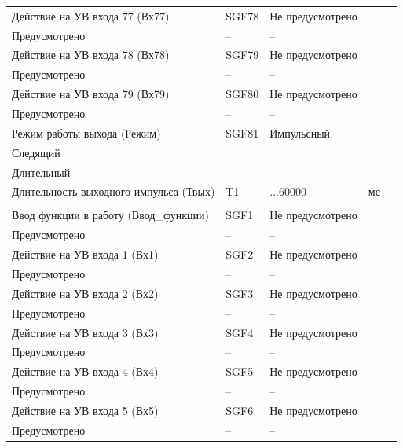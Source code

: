 \begin{longtable}{|>{\centering\arraybackslash}m{5.3cm}|>{\centering\arraybackslash}m{3.3cm}|>{\centering\arraybackslash}m{4.2cm}|>{\centering\arraybackslash}m{1.8cm}|>{\centering\arraybackslash}m{1cm}|}
\hline
\centering Действие на УВ входа 77 (Вх77)  & \centering SGF78 & \centering Не предусмотрено \\ Предусмотрено & \centering -- & \centering \arraybackslash -- \\
\hline
\centering Действие на УВ входа 78 (Вх78)  & \centering SGF79 & \centering Не предусмотрено \\ Предусмотрено & \centering -- & \centering \arraybackslash -- \\
\hline
\centering Действие на УВ входа 79 (Вх79)  & \centering SGF80 & \centering Не предусмотрено \\ Предусмотрено & \centering -- & \centering \arraybackslash -- \\
\hline
\centering Режим работы выхода (Режим)  & \centering SGF81 & \centering Импульсный \\ Следящий \\ Длительный & \centering -- & \centering \arraybackslash -- \\
\hline
\centering Длительность выходного импульса (Твых)  & \centering T1 & \centering 50...60000 & \centering мс & \centering \arraybackslash 10 \\
\hline
\multicolumn{5}{|c|}{ УВ12 } \\ \hline 
\centering Ввод функции в работу (Ввод\_функции)  & \centering SGF1 & \centering Не предусмотрено \\ Предусмотрено & \centering -- & \centering \arraybackslash -- \\
\hline
\centering Действие на УВ входа 1 (Вх1)  & \centering SGF2 & \centering Не предусмотрено \\ Предусмотрено & \centering -- & \centering \arraybackslash -- \\
\hline
\centering Действие на УВ входа 2 (Вх2)  & \centering SGF3 & \centering Не предусмотрено \\ Предусмотрено & \centering -- & \centering \arraybackslash -- \\
\hline
\centering Действие на УВ входа 3 (Вх3)  & \centering SGF4 & \centering Не предусмотрено \\ Предусмотрено & \centering -- & \centering \arraybackslash -- \\
\hline
\centering Действие на УВ входа 4 (Вх4)  & \centering SGF5 & \centering Не предусмотрено \\ Предусмотрено & \centering -- & \centering \arraybackslash -- \\
\hline
\centering Действие на УВ входа 5 (Вх5)  & \centering SGF6 & \centering Не предусмотрено \\ Предусмотрено & \centering -- & \centering \arraybackslash -- \\

\end{longtable}
